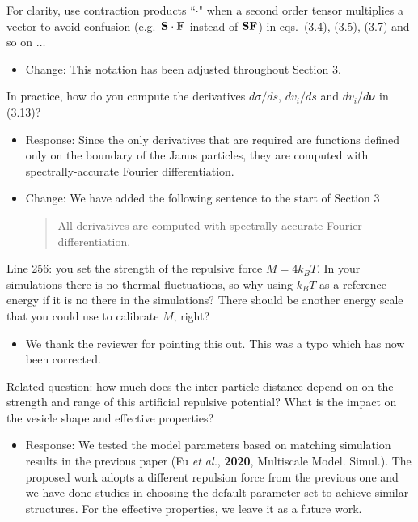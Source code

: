 \documentclass[11pt]{article}
\newcommand{\comment}[1]{{\color{blue} #1}}
\begin{document}
\noindent
\comment{For clarity, use contraction products ``$\cdot$" when a second
order tensor multiplies a vector to avoid confusion (e.g.~${\bf S} \cdot
{\bf F}$ instead of ${\bf SF}$) in eqs.~(3.4), (3.5), (3.7) and so on
$\ldots$}
\begin{itemize}
  \item Change: This notation has been adjusted throughout Section 3.
\end{itemize}

\noindent
\comment{In practice, how do you compute the derivatives $d\sigma /ds$,
$dv_i/ds$ and $dv_i/d\boldsymbol{\nu}$ in (3.13)?}
\begin{itemize}
  \item Response: Since the only derivatives that are required are functions
    defined only on the boundary of the Janus particles, they are
    computed with spectrally-accurate Fourier differentiation.

  \item Change: We have added the following sentence to the start of Section 3
    \begin{quotation}
      All derivatives are computed with spectrally-accurate Fourier
      differentiation.
    \end{quotation}
\end{itemize}

\noindent
\comment{Line 256: you set the strength of the repulsive force $M = 4k_B
T$. In your simulations there is no thermal fluctuations, so why using
$k_B T$ as a reference energy if it is no there in the simulations?
There should be another energy scale that you could use to calibrate
$M$, right?}
\begin{itemize}
\item We thank the reviewer for pointing this out.  This was a typo which has now been corrected. 
\end{itemize}

\noindent
\comment{Related question: how much does the inter-particle distance
depend on on the strength and range of this artificial repulsive
potential? What is the impact on the vesicle shape and effective
properties?}
\begin{itemize}
  \item Response: We tested the model parameters based on matching simulation results in the previous paper  (Fu {\sl et al.}, {\bf 2020}, Multiscale Model. Simul.). The proposed work adopts a different repulsion force from the previous one and we have done studies in choosing the default parameter set to achieve similar structures. For the effective properties, we leave it as a future work.
\end{itemize}
\end{document}
